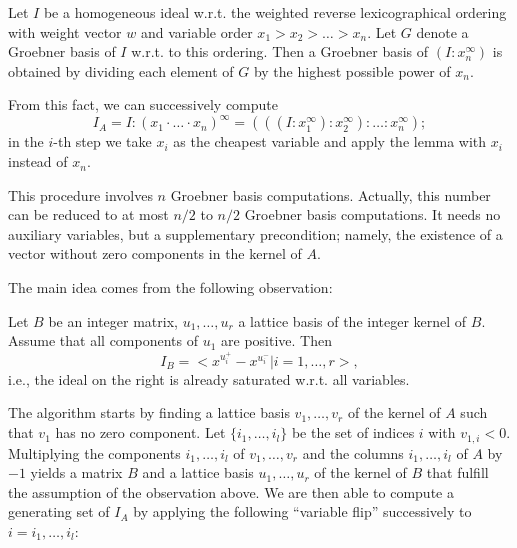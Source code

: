 Let $I$ be a homogeneous ideal w.r.t. the weighted reverse
lexicographical ordering with weight vector $w$ and variable order $x_1
> x_2 > \ldots > x_n$. Let $G$ denote a Groebner basis of $I$ w.r.t. to
this ordering.  Then a Groebner basis of $(I:x_n^\infty)$ is obtained by
dividing each element of $G$ by the highest possible power of $x_n$.

From this fact, we can successively compute
$$ I_A= I:(x_1\cdot\ldots\cdot x_n)^\infty
=(((I:x_1^\infty):x_2^\infty):\ldots :x_n^\infty); $$
in the $i$-th step we take $x_i$ as the cheapest variable and apply the
lemma with $x_i$ instead of $x_n$.

This procedure involves $n$ Groebner basis computations. Actually, this
number can be reduced to at most $n/2$
to $n/2$ Groebner basis
computations. It needs no auxiliary variables, but a supplementary
precondition; namely, the existence of a vector without zero components
in the kernel of $A$.

The main idea comes from the following observation:

Let $B$ be an integer matrix, $u_1,\ldots,u_r$ a lattice basis of the
integer kernel of $B$. Assume that all components of $u_1$ are
positive. Then
$$ I_B=<x^{u_i^+}-x^{u_i^-}|i=1,\ldots,r>, $$
i.e., the ideal on the right is already saturated w.r.t. all variables.

The algorithm starts by finding a lattice basis $v_1,\ldots,v_r$ of the
kernel of $A$ such that $v_1$ has no zero component. Let
$\{i_1,\ldots,i_l\}$ be the set of indices $i$ with
$v_{1,i}<0$. Multiplying the components $i_1,\ldots,i_l$ of
$v_1,\ldots,v_r$ and the columns $i_1,\ldots,i_l$ of $A$ by $-1$ yields
a matrix $B$ and a lattice basis $u_1,\ldots,u_r$ of the kernel of $B$
that fulfill the assumption of the observation above. We are then able
to compute a generating set of $I_A$ by applying the following
``variable flip'' successively to $i=i_1,\ldots,i_l$:

